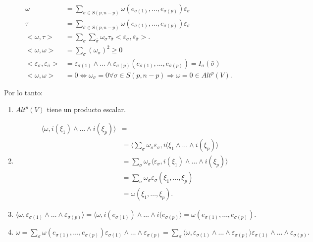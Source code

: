 \documentclass{article}
\newenvironment{itemize*}%
  {\vspace*{-0mm}
   \begin{itemize}%
    \setlength{\itemsep}{0pt}%
    \setlength{\parskip}{0pt}}%
  {\vspace*{-0mm}
   \end{itemize}}
\begin{document}
\begin{itemize*}
  \begin{equation}
    \begin{split}
      \omega &= \sum_{\sigma\in S(p,n-p)}\omega(e_{\sigma(1)},\dots,e_{\sigma(p)})\varepsilon_\sigma \\
      \tau &=\sum_{\bar{\sigma}\in S(p,n-p)}\omega(e_{\bar{\sigma}(1)},\dots,e_{\bar{\sigma}(p)})\varepsilon_{\bar{\sigma} } \\
      <\omega,\tau> &= \sum_{\sigma}\sum_{\bar{\sigma}} \omega_\sigma \tau_{\bar{\sigma}}<\varepsilon_\sigma,\varepsilon_{\bar{\sigma}}>.\\
  <\omega,\omega> &= \sum_\sigma (\omega_\sigma)^2\ge 0 \\
  <\varepsilon_\sigma,\varepsilon_{\bar{\sigma}}>&= \varepsilon_{\sigma(1)}\wedge \dots \wedge \varepsilon_{\sigma(p)}(e_{\bar{\sigma}(1)},\dots, e_{\bar{\sigma}(p)})= I_{\sigma}(\bar{\sigma}) \\
  <\omega,\omega> &=0 \Leftrightarrow \omega_\sigma =0 \forall \sigma \in S(p,n-p)\Rightarrow \omega=0 \in Alt^p(V).
    \end{split}
  \end{equation}
\item Por lo tanto:
  \begin{enumerate}
  \item $Alt^p(V)$ tiene un producto escalar.
  \item
    \begin{equation}
      \begin{split}
        \langle \omega,i(\xi_1)\wedge \dots \wedge i(\xi_p) \rangle &= \\
        &= \langle \sum_\sigma \omega_\sigma \varepsilon_\sigma,i(\xi_1\wedge \dots \wedge i(\xi_p)\rangle \\
        &=\sum_\sigma \omega_\sigma \langle \varepsilon_\sigma,i(\xi_1)\wedge \dots \wedge i(\xi_p) \rangle \\
        &= \sum_\sigma \omega_\sigma \varepsilon_\sigma(\xi_1,\dots,\xi_p) \\
        &= \omega(\xi_1,\dots,\xi_p).
      \end{split}
    \end{equation}
  \item $\langle \omega, \varepsilon_{\sigma(1)}\wedge \dots \wedge \varepsilon_{\sigma(p)} \rangle = \langle \omega, i(e_{\sigma(1)})\wedge \dots \wedge i(e_{\sigma(p)}\rangle = \omega(e_{\sigma(1)},\dots,e_{\sigma(p)}). $
  \item $\omega =\sum_\sigma \omega(e_{\sigma(1)},\dots , e_{\sigma(p)}) \varepsilon_{\sigma(1)} \wedge \dots \wedge \varepsilon_{\sigma(p)} = \sum_\sigma \langle \omega, \varepsilon_{\sigma(1)}\wedge \dots \wedge \varepsilon_{\sigma(p)} \rangle\varepsilon_{\sigma(1)}\wedge \dots \wedge \varepsilon_{\sigma(p)}.$
  \end{enumerate}


\end{itemize*}
\end{document}

